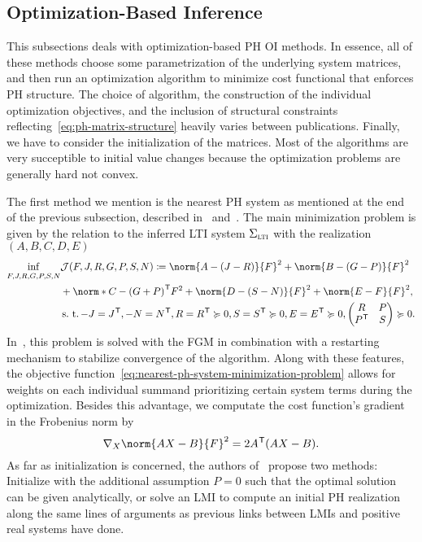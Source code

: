\subsection{Optimization-Based Inference}\label{subsec:optimization-based-inference}

This subsections deals with optimization-based \ac{PH} \ac{OI} methods.
In essence, all of these methods choose some parametrization of the underlying system matrices, and then run an optimization algorithm to minimize cost functional that enforces \ac{PH} structure.
The choice of algorithm, the construction of the individual optimization objectives, and the inclusion of structural constraints reflecting~\eqref{eq:ph-matrix-structure} heavily varies between publications.
Finally, we have to consider the initialization of the matrices.
Most of the algorithms are very succeptible to initial value changes because the optimization problems are generally hard not convex.

The first method we mention is the nearest \ac{PH} system as mentioned at the end of the previous subsection, described in~\cite{Gillis2018} and~\cite{Cherifi2019}.
The main minimization problem is given by the relation to the inferred \ac{LTI} system $\Sigma_{\textnormal{\scshape lti}}$ with the realization $(A, B, C, D, E)$
\begin{equation}\label{eq:nearest-ph-system-minimization-problem}
    \begin{alignedat}{4}
        \eqinf\limits_{F, J, R, G, P, S, N} &\mcl{J}(F, J, R, G, P, S, N) \coloneqq \norm{A - (J - R)}{F}^2 + \norm{B - (G - P)}{F}^2 \\
        &+ \norm*{C - {(G + P)}\trans}{F}^2 + \norm{D - (S - N)}{F}^2 + \norm{E - F}{F}^2, \\
        &\suchthat -J = J\trans, -N = N\trans, R = R\trans \succcurlyeq 0, S = S\trans \succcurlyeq 0, E = E\trans \succcurlyeq 0, \begin{pmatrix}
            R & P \\
            P\trans & S
        \end{pmatrix} \succcurlyeq 0.
    \end{alignedat}
\end{equation}
In~\cite{Gillis2018}, this problem is solved with the \ac{FGM} in combination with a restarting mechanism to stabilize convergence of the algorithm.
Along with these features, the objective function~\eqref{eq:nearest-ph-system-minimization-problem} allows for weights on each individual summand prioritizing certain system terms during the optimization.
Besides this advantage, we computate the cost function's gradient in the Frobenius norm by
\begin{equation*}
    \nabla_X \norm{A X - B}{F}^2 = 2 A\trans (A X - B).
\end{equation*}
As far as initialization is concerned, the authors of~\cite{Gillis2018} propose two methods: Initialize with the additional assumption $P = 0$ such that the optimal solution can be given analytically, or solve an \ac{LMI} to compute an initial \ac{PH} realization along the same lines of arguments as previous links between \acp{LMI} and positive real systems have done.

